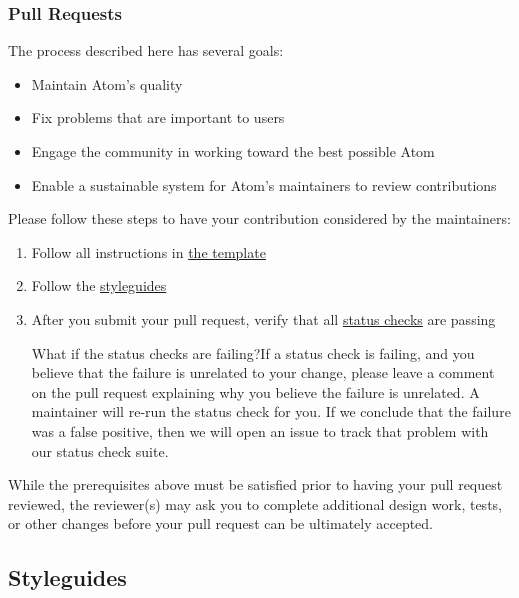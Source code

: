 \hypertarget{pull-requests}{%
\subsubsection{Pull Requests}\label{pull-requests}}

The process described here has several goals:

\begin{itemize}
\tightlist
\item
  Maintain Atom's quality
\item
  Fix problems that are important to users
\item
  Engage the community in working toward the best possible Atom
\item
  Enable a sustainable system for Atom's maintainers to review
  contributions
\end{itemize}

Please follow these steps to have your contribution considered by the
maintainers:

\begin{enumerate}
\def\labelenumi{\arabic{enumi}.}
\tightlist
\item
  Follow all instructions in \href{PULL_REQUEST_TEMPLATE.md}{the
  template}
\item
  Follow the \protect\hyperlink{styleguides}{styleguides}
\item
  After you submit your pull request, verify that all
  \href{https://help.github.com/articles/about-status-checks/}{status
  checks} are passing

  What if the status checks are failing?If a status check is failing,
  and you believe that the failure is unrelated to your change, please
  leave a comment on the pull request explaining why you believe the
  failure is unrelated. A maintainer will re-run the status check for
  you. If we conclude that the failure was a false positive, then we
  will open an issue to track that problem with our status check suite.
\end{enumerate}

While the prerequisites above must be satisfied prior to having your
pull request reviewed, the reviewer(s) may ask you to complete
additional design work, tests, or other changes before your pull request
can be ultimately accepted.

\hypertarget{styleguides}{%
\subsection{Styleguides}\label{styleguides}}

